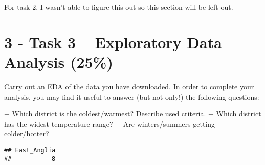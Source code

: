 \documentclass[
]{article}
\newenvironment{Shaded}{\begin{snugshade}}{\end{snugshade}}
\newcommand{\AttributeTok}[1]{\textcolor[rgb]{0.77,0.63,0.00}{#1}}
\newcommand{\CommentTok}[1]{\textcolor[rgb]{0.56,0.35,0.01}{\textit{#1}}}
\newcommand{\ConstantTok}[1]{\textcolor[rgb]{0.00,0.00,0.00}{#1}}
\newcommand{\ControlFlowTok}[1]{\textcolor[rgb]{0.13,0.29,0.53}{\textbf{#1}}}
\newcommand{\FunctionTok}[1]{\textcolor[rgb]{0.00,0.00,0.00}{#1}}
\newcommand{\NormalTok}[1]{#1}
\newcommand{\OtherTok}[1]{\textcolor[rgb]{0.56,0.35,0.01}{#1}}
\newcommand{\SpecialCharTok}[1]{\textcolor[rgb]{0.00,0.00,0.00}{#1}}
\begin{document}
\begin{Shaded}
\end{Shaded}

For task 2, I wasn't able to figure this out so this section will be
left out.

\hypertarget{task-3-exploratory-data-analysis-25}{%
\section{3 - Task 3 -- Exploratory Data Analysis
(25\%)}\label{task-3-exploratory-data-analysis-25}}

Carry out an EDA of the data you have downloaded. In order to complete
your analysis, you may find it useful to answer (but not only!) the
following questions:

− Which district is the coldest/warmest? Describe used criteria. − Which
district has the widest temperature range? − Are winters/summers getting
colder/hotter?

\begin{Shaded}
\end{Shaded}

\begin{verbatim}
## East_Anglia 
##           8
\end{verbatim}

\begin{Shaded}
\end{Shaded}
\end{document}
